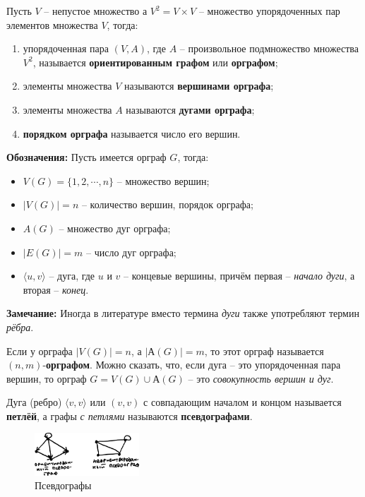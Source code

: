 \documentclass[12pt, a4paper]{article}
\newcommand{\irv}[1]{\langle #1 \rangle}
\begin{document}
Пусть $V$ -- непустое множество а $V^2 = V \times V$ -- множество упорядоченных пар элементов множества $V$, тогда:
\begin{enumerate}
 \item упорядоченная пара $(V, A)$, где $A$ -- произвольное подмножество множества $V^2$, называется \textbf{ориентированным графом} или \textbf{орграфом};
 \item элементы множества $V$ называются \textbf{вершинами орграфа};
 \item элементы множества $A$ называются \textbf{дугами орграфа};
 \item \textbf{порядком орграфа} называется число его вершин.
\end{enumerate}
\textbf{Обозначения:} Пусть имеется орграф $G$, тогда:
\begin{itemize}
 \item $V(G) = \{ 1, 2, \cdots, n \}$ -- множество вершин;
 \item $|V(G)| = n$ -- количество вершин, порядок орграфа;
 \item $A(G)$ -- множество дуг орграфа;
 \item $|E(G)| = m$ -- число дуг орграфа;
 \item $\irv{u, v}$ -- дуга, где $u$ и $v$ -- концевые вершины, причём первая -- \textit{начало дуги}, а вторая -- \textit{конец}.
\end{itemize}

\textbf{Замечание:} Иногда в литературе вместо термина \textit{дуги} также употребляют термин \textit{рёбра}.

Если у орграфа $|V(G)| = n$, а $|А(G)| = m$, то этот орграф называется $(n, m)$-\textbf{орграфом}. Можно сказать, что, если дуга -- это упорядоченная пара вершин, то орграф $G = V(G) \cup А(G)$ -- это \textit{совокупность вершин и дуг}.

Дуга (ребро) $\irv{v, v}$ или $(v, v)$ с совпадающим началом и концом называется \textbf{петлёй}, а графы \textit{с петлями} называются \textbf{псевдографами}.

\begin{figure}[h]
 \centering
 \includegraphics[width=0.35\textwidth]{27}
 \vspace{-4mm}
  \caption{Псевдографы}
\end{figure}
\end{document}
